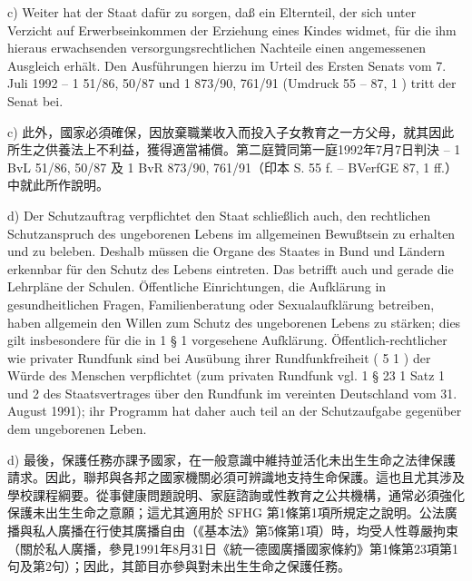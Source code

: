 \documentclass[12pt]{article}
\begin{document}
\begin{sourcepara}[title={原文D.64}]
c) Weiter hat der Staat dafür zu sorgen, daß ein Elternteil, der sich unter Verzicht auf Erwerbseinkommen der Erziehung eines Kindes widmet, für die ihm hieraus erwachsenden versorgungsrechtlichen Nachteile einen angemessenen Ausgleich erhält. Den Ausführungen hierzu im Urteil des Ersten Senats vom 7. Juli 1992 -- 1 \abbrBvL{} 51/86, 50/87 und 1 \abbrBvR{} 873/90, 761/91 (Umdruck \abbrS{} 55 \abbrF{} -- \abbrBVerfGE{} 87, 1 \abbrFF{}) tritt der Senat bei.
\end{sourcepara}
\begin{transpara}
c) 此外，國家必須確保，因放棄職業收入而投入子女教育之一方父母，就其因此所生之供養法上不利益，獲得適當補償。第二庭贊同第一庭1992年7月7日判決 -- 1 BvL 51/86, 50/87 及 1 BvR 873/90, 761/91（印本 S. 55 f. -- BVerfGE 87, 1 ff.）中就此所作說明。
\end{transpara}

\begin{sourcepara}[title={原文D.65}]
d) Der Schutzauftrag verpflichtet den Staat schließlich auch, den rechtlichen Schutzanspruch des ungeborenen Lebens im allgemeinen Bewußtsein zu erhalten und zu beleben. Deshalb müssen die Organe des Staates in Bund und Ländern erkennbar für den Schutz des Lebens eintreten. Das betrifft auch und gerade die Lehrpläne der Schulen. Öffentliche Einrichtungen, die Aufklärung in gesundheitlichen Fragen, Familienberatung oder Sexualaufklärung betreiben, haben allgemein den Willen zum Schutz des ungeborenen Lebens zu stärken; dies gilt insbesondere für die in \abbrArt{} 1 § 1 \abbrSFHG{} vorgesehene Aufklärung. Öffentlich-rechtlicher wie privater Rundfunk sind bei Ausübung ihrer Rundfunkfreiheit (\abbrArt{} 5 \abbrAbs{} 1 \abbrGG{}\ggfnArtFiveOneDE{}) der Würde des Menschen verpflichtet (zum privaten Rundfunk vgl. \abbrArt{} 1 § 23 \abbrAbs{} 1 Satz 1 und 2 des Staatsvertrages über den Rundfunk im vereinten Deutschland vom 31. August 1991); ihr Programm hat daher auch teil an der Schutzaufgabe gegenüber dem ungeborenen Leben.
\end{sourcepara}
\begin{transpara}
d) 最後，保護任務亦課予國家，在一般意識中維持並活化未出生生命之法律保護請求。因此，聯邦與各邦之國家機關必須可辨識地支持生命保護。這也且尤其涉及學校課程綱要。從事健康問題說明、家庭諮詢或性教育之公共機構，通常必須強化保護未出生生命之意願；這尤其適用於 SFHG 第1條第1項所規定之說明。公法廣播與私人廣播在行使其廣播自由（《基本法》第5條第1項\ggfnArtFiveOneZH{}）時，均受人性尊嚴拘束（關於私人廣播，參見1991年8月31日《統一德國廣播國家條約》第1條第23項第1句及第2句）；因此，其節目亦參與對未出生生命之保護任務。
\end{transpara}
\end{document}

